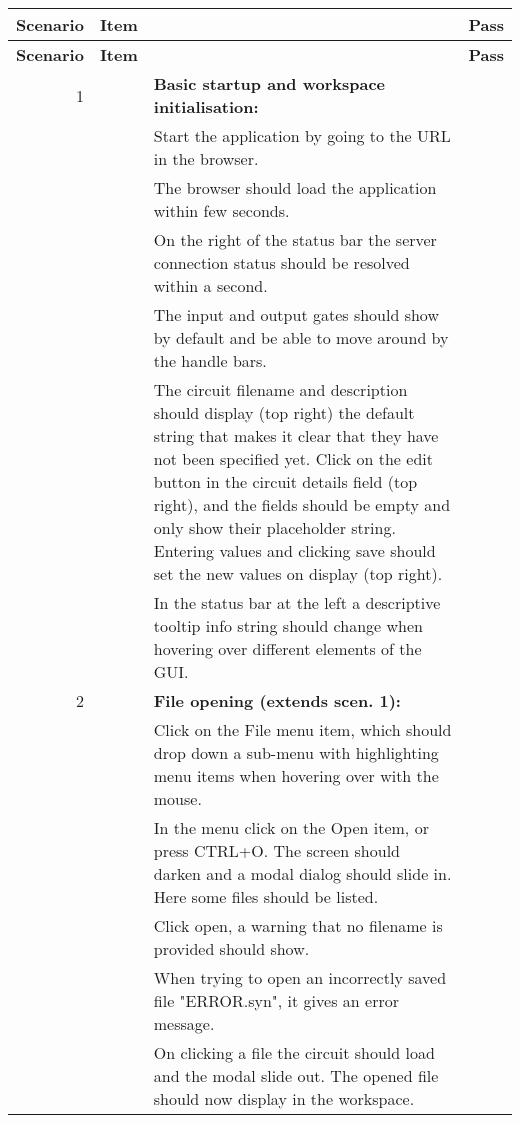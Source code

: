 \documentclass{article}
\newcounter{step}
\newcommand{\step}{\arabic{step}\stepcounter{step}}
\begin{document}
\begin{center}
\begin{longtable}{r r  p{} l } \toprule
\textbf{Scenario} & \textbf{Item} & & \textbf{Pass} \\\midrule
\endfirsthead
\toprule
\textbf{Scenario} & \textbf{Item} & & \textbf{Pass} \\\midrule
\endhead

1 && \textbf{Basic startup and workspace initialisation:}\\
&\step& Start the application by going to the URL in the browser.\\
&\step& The browser should load the application within few seconds.\\
&\step& On the right of the status bar the server connection status should be resolved within a second. \\
&\step& The input and output gates should show by default and be able to move around by the handle bars. \\
&\step& The circuit filename and description should display (top right) the default string that makes it clear that they have not been specified yet. Click on the edit button in the circuit details field (top right), and the fields should be empty and only show their placeholder string. Entering values and clicking save should set the new values on display (top right).\\
&\step& In the status bar at the left a descriptive tooltip info string should change when hovering over different elements of the GUI. & \\ \midrule

2 &\setcounter{step}{1}& \textbf{File opening (extends scen. 1):}\\
&\step& Click on the File menu item, which should drop down a sub-menu with highlighting menu items when hovering over with the mouse. \\
&\step& In the menu click on the Open item, or press CTRL+O. The screen should darken and a modal dialog should slide in. Here some files should be listed.\\
&\step& Click open, a warning that no filename is provided should show.\\
&\step& When trying to open an incorrectly saved file "ERROR.syn", it gives an error message.\\
&\step&On clicking a file the circuit should load and the modal slide out. The opened file should now display in the workspace.\\\midrule


\end{longtable}
\end{center}
\end{document}
